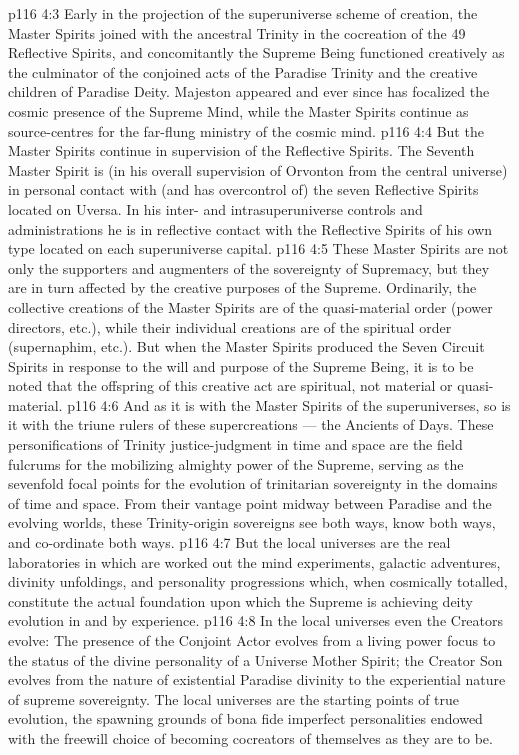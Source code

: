\vs p116 4:3 Early in the projection of the superuniverse scheme of creation, the Master Spirits joined with the ancestral Trinity in the cocreation of the 49 Reflective Spirits, and concomitantly the Supreme Being functioned creatively as the culminator of the conjoined acts of the Paradise Trinity and the creative children of Paradise Deity. Majeston appeared and ever since has focalized the cosmic presence of the Supreme Mind, while the Master Spirits continue as source\hyp{}centres for the far\hyp{}flung ministry of the cosmic mind.
\vs p116 4:4 But the Master Spirits continue in supervision of the Reflective Spirits. The Seventh Master Spirit is (in his overall supervision of Orvonton from the central universe) in personal contact with (and has overcontrol of) the seven Reflective Spirits located on Uversa. In his inter\hyp{} and intrasuperuniverse controls and administrations he is in reflective contact with the Reflective Spirits of his own type located on each superuniverse capital.
\vs p116 4:5 These Master Spirits are not only the supporters and augmenters of the sovereignty of Supremacy, but they are in turn affected by the creative purposes of the Supreme. Ordinarily, the collective creations of the Master Spirits are of the quasi\hyp{}material order (power directors, etc.), while their individual creations are of the spiritual order (supernaphim, etc.). But when the Master Spirits  produced the Seven Circuit Spirits in response to the will and purpose of the Supreme Being, it is to be noted that the offspring of this creative act are spiritual, not material or quasi\hyp{}material.
\vs p116 4:6 \pc And as it is with the Master Spirits of the superuniverses, so is it with the triune rulers of these supercreations --- the Ancients of Days. These personifications of Trinity justice\hyp{}judgment in time and space are the field fulcrums for the mobilizing almighty power of the Supreme, serving as the sevenfold focal points for the evolution of trinitarian sovereignty in the domains of time and space. From their vantage point midway between Paradise and the evolving worlds, these Trinity\hyp{}origin sovereigns see both ways, know both ways, and co\hyp{}ordinate both ways.
\vs p116 4:7 \pc But the local universes are the real laboratories in which are worked out the mind experiments, galactic adventures, divinity unfoldings, and personality progressions which, when cosmically totalled, constitute the actual foundation upon which the Supreme is achieving deity evolution in and by experience.
\vs p116 4:8 In the local universes even the Creators evolve: The presence of the Conjoint Actor evolves from a living power focus to the status of the divine personality of a Universe Mother Spirit; the Creator Son evolves from the nature of existential Paradise divinity to the experiential nature of supreme sovereignty. The local universes are the starting points of true evolution, the spawning grounds of bona fide imperfect personalities endowed with the freewill choice of becoming cocreators of themselves as they are to be.
